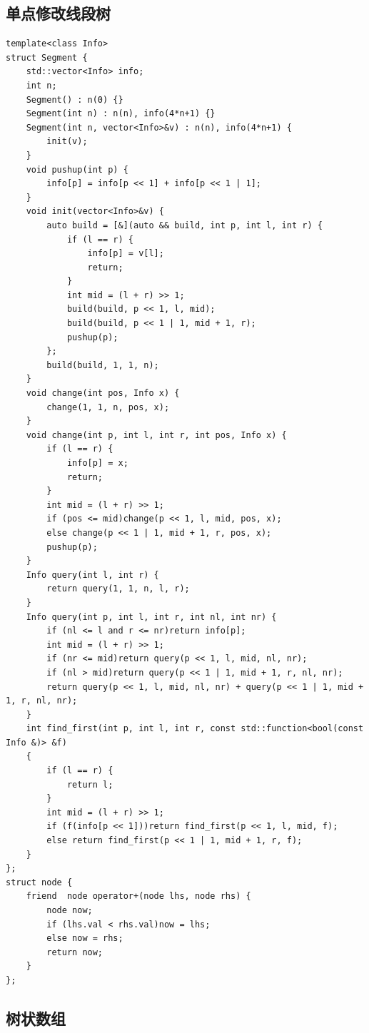 \documentclass[a4paper,10pt]{article}
\begin{document}
\subsection{单点修改线段树}
\thispagestyle{fancy}

\noindent\begin{lstlisting}
template<class Info>
struct Segment {
    std::vector<Info> info;
    int n;
    Segment() : n(0) {}
    Segment(int n) : n(n), info(4*n+1) {}
    Segment(int n, vector<Info>&v) : n(n), info(4*n+1) {
        init(v);
    }
    void pushup(int p) {
        info[p] = info[p << 1] + info[p << 1 | 1];
    }
    void init(vector<Info>&v) {
        auto build = [&](auto && build, int p, int l, int r) {
            if (l == r) {
                info[p] = v[l];
                return;
            }
            int mid = (l + r) >> 1;
            build(build, p << 1, l, mid);
            build(build, p << 1 | 1, mid + 1, r);
            pushup(p);
        };
        build(build, 1, 1, n);
    }
    void change(int pos, Info x) {
        change(1, 1, n, pos, x);
    }
    void change(int p, int l, int r, int pos, Info x) {
        if (l == r) {
            info[p] = x;
            return;
        }
        int mid = (l + r) >> 1;
        if (pos <= mid)change(p << 1, l, mid, pos, x);
        else change(p << 1 | 1, mid + 1, r, pos, x);
        pushup(p);
    }
    Info query(int l, int r) {
        return query(1, 1, n, l, r);
    }
    Info query(int p, int l, int r, int nl, int nr) {
        if (nl <= l and r <= nr)return info[p];
        int mid = (l + r) >> 1;
        if (nr <= mid)return query(p << 1, l, mid, nl, nr);
        if (nl > mid)return query(p << 1 | 1, mid + 1, r, nl, nr);
        return query(p << 1, l, mid, nl, nr) + query(p << 1 | 1, mid + 1, r, nl, nr);
    }
    int find_first(int p, int l, int r, const std::function<bool(const Info &)> &f)
    {
        if (l == r) {
            return l;
        }
        int mid = (l + r) >> 1;
        if (f(info[p << 1]))return find_first(p << 1, l, mid, f);
        else return find_first(p << 1 | 1, mid + 1, r, f);
    }
};
struct node {
    friend  node operator+(node lhs, node rhs) {
        node now;
        if (lhs.val < rhs.val)now = lhs;
        else now = rhs;
        return now;
    }
};\end{lstlisting}

\subsection{树状数组}
\thispagestyle{fancy}
\end{document}
